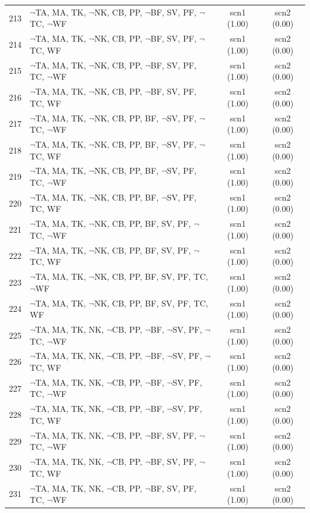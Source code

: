 \documentclass[12pt]{article}
\begin{document}
\begin{longtable}{|l|l|c|c|}
213 & $\neg$TA, MA, TK, $\neg$NK, CB, PP, $\neg$BF, SV, PF, $\neg$TC, $\neg$WF & scn1 (1.00) & scn2 (0.00)\\
214 & $\neg$TA, MA, TK, $\neg$NK, CB, PP, $\neg$BF, SV, PF, $\neg$TC, WF & scn1 (1.00) & scn2 (0.00)\\
215 & $\neg$TA, MA, TK, $\neg$NK, CB, PP, $\neg$BF, SV, PF, TC, $\neg$WF & scn1 (1.00) & scn2 (0.00)\\
216 & $\neg$TA, MA, TK, $\neg$NK, CB, PP, $\neg$BF, SV, PF, TC, WF & scn1 (1.00) & scn2 (0.00)\\
217 & $\neg$TA, MA, TK, $\neg$NK, CB, PP, BF, $\neg$SV, PF, $\neg$TC, $\neg$WF & scn1 (1.00) & scn2 (0.00)\\
218 & $\neg$TA, MA, TK, $\neg$NK, CB, PP, BF, $\neg$SV, PF, $\neg$TC, WF & scn1 (1.00) & scn2 (0.00)\\
219 & $\neg$TA, MA, TK, $\neg$NK, CB, PP, BF, $\neg$SV, PF, TC, $\neg$WF & scn1 (1.00) & scn2 (0.00)\\
220 & $\neg$TA, MA, TK, $\neg$NK, CB, PP, BF, $\neg$SV, PF, TC, WF & scn1 (1.00) & scn2 (0.00)\\
221 & $\neg$TA, MA, TK, $\neg$NK, CB, PP, BF, SV, PF, $\neg$TC, $\neg$WF & scn1 (1.00) & scn2 (0.00)\\
222 & $\neg$TA, MA, TK, $\neg$NK, CB, PP, BF, SV, PF, $\neg$TC, WF & scn1 (1.00) & scn2 (0.00)\\
223 & $\neg$TA, MA, TK, $\neg$NK, CB, PP, BF, SV, PF, TC, $\neg$WF & scn1 (1.00) & scn2 (0.00)\\
224 & $\neg$TA, MA, TK, $\neg$NK, CB, PP, BF, SV, PF, TC, WF & scn1 (1.00) & scn2 (0.00)\\
225 & $\neg$TA, MA, TK, NK, $\neg$CB, PP, $\neg$BF, $\neg$SV, PF, $\neg$TC, $\neg$WF & scn1 (1.00) & scn2 (0.00)\\
226 & $\neg$TA, MA, TK, NK, $\neg$CB, PP, $\neg$BF, $\neg$SV, PF, $\neg$TC, WF & scn1 (1.00) & scn2 (0.00)\\
227 & $\neg$TA, MA, TK, NK, $\neg$CB, PP, $\neg$BF, $\neg$SV, PF, TC, $\neg$WF & scn1 (1.00) & scn2 (0.00)\\
228 & $\neg$TA, MA, TK, NK, $\neg$CB, PP, $\neg$BF, $\neg$SV, PF, TC, WF & scn1 (1.00) & scn2 (0.00)\\
229 & $\neg$TA, MA, TK, NK, $\neg$CB, PP, $\neg$BF, SV, PF, $\neg$TC, $\neg$WF & scn1 (1.00) & scn2 (0.00)\\
230 & $\neg$TA, MA, TK, NK, $\neg$CB, PP, $\neg$BF, SV, PF, $\neg$TC, WF & scn1 (1.00) & scn2 (0.00)\\
231 & $\neg$TA, MA, TK, NK, $\neg$CB, PP, $\neg$BF, SV, PF, TC, $\neg$WF & scn1 (1.00) & scn2 (0.00)\\

\end{longtable}
\end{document}
